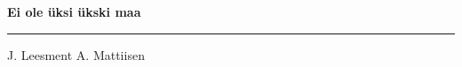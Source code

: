 \documentclass[10pt]{book}
\begin{document}
{
  \samepage
  \raggedbottom
  \raggedright
  \sloppy


  \vspace{0.2in}

  \noindent\begin{minipage}{.1\textwidth}
    \hfill\vspace{0.1in}
  \end{minipage}%
  \noindent\begin{minipage}{.8\textwidth}
    \centering
    \bfseries
    \large Ei ole \"uksi \"ukski maa
  \end{minipage}%
  \noindent\begin{minipage}{.1\textwidth}
      \hfill\vspace{0.1in}
  \end{minipage}

  \nopagebreak[4]
  \vspace{0.1in}
  \nopagebreak[4]
  \hrule height 0.05ex
  \nopagebreak[4]
  \vspace{-0.05in}

  {\footnotesize J. Leesment \hfill A. Mattiisen }\\
  \vspace{0.01in}



}
\end{document}
